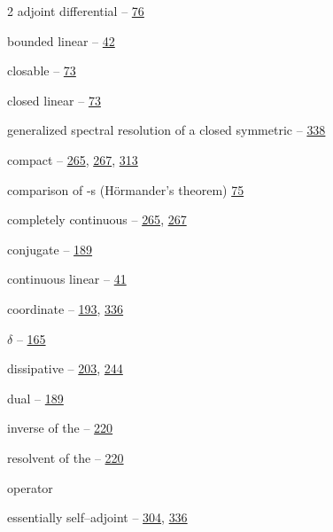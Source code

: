 \begin{multicols}{2}
\hspace*{1.1em}adjoint differential -- \hyperlink{page.76}{76}\par
\hspace*{1.1em}bounded linear -- \hyperlink{page.42}{42}\par
\hspace*{1.1em}closable -- \hyperlink{page.73}{73}\par
\hspace*{1.1em}closed linear -- \hyperlink{page.73}{73}\par
\hspace*{1.1em}generalized spectral resolution of a closed symmetric -- \hyperlink{page.338}{338}\par
\hspace*{1.1em}compact -- \hyperlink{page.265}{265}, \hyperlink{page.267}{267}, \hyperlink{page.313}{313}\par
\hspace*{1.1em}comparison of -s (Hörmander's theorem) \hyperlink{page.75}{75}\par
\hspace*{1.1em}completely continuous -- \hyperlink{page.265}{265}, \hyperlink{page.267}{267}\par
\hspace*{1.1em}conjugate -- \hyperlink{page.189}{189}\par
\hspace*{1.1em}continuous linear -- \hyperlink{page.41}{41}\par
\hspace*{1.1em}coordinate -- \hyperlink{page.193}{193}, \hyperlink{page.336}{336}\par
\hspace*{1.1em}$ \delta $ -- \hyperlink{page.165}{165}\par
\hspace*{1.1em}dissipative -- \hyperlink{page.203}{203}, \hyperlink{page.244}{244}\par
\hspace*{1.1em}dual -- \hyperlink{page.189}{189}\par
\hspace*{2.2em}inverse of the -- \hyperlink{page.220}{220}\par
\hspace*{2.2em}resolvent of the -- \hyperlink{page.220}{220}\par
\noindent operator\par
\hspace*{1.1em}essentially self--adjoint -- \hyperlink{page.304}{304}, \hyperlink{page.336}{336}\par

\end{multicols}
